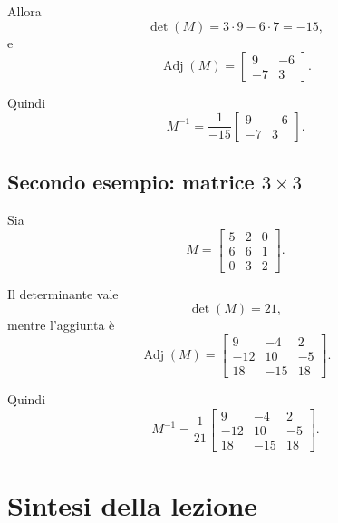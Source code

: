 Allora
\[
\det(M)=3\cdot 9-6\cdot 7=-15,
\]
e
\[
\operatorname{Adj}(M)=
\begin{bmatrix}
9 & -6\\
-7 & 3
\end{bmatrix}.
\]

Quindi
\[
M^{-1}
=
\frac{1}{-15}
\begin{bmatrix}
9 & -6\\
-7 & 3
\end{bmatrix}.
\]

\subsection{Secondo esempio: matrice \(3\times 3\)}

Sia
\[
M=
\begin{bmatrix}
5 & 2 & 0\\
6 & 6 & 1\\
0 & 3 & 2
\end{bmatrix}.
\]

Il determinante vale
\[
\det(M)=21,
\]
mentre l'aggiunta \`e
\[
\operatorname{Adj}(M)=
\begin{bmatrix}
9 & -4 & 2\\
-12 & 10 & -5\\
18 & -15 & 18
\end{bmatrix}.
\]

Quindi
\[
M^{-1}
=
\frac{1}{21}
\begin{bmatrix}
9 & -4 & 2\\
-12 & 10 & -5\\
18 & -15 & 18
\end{bmatrix}.
\]

\section{Sintesi della lezione}

